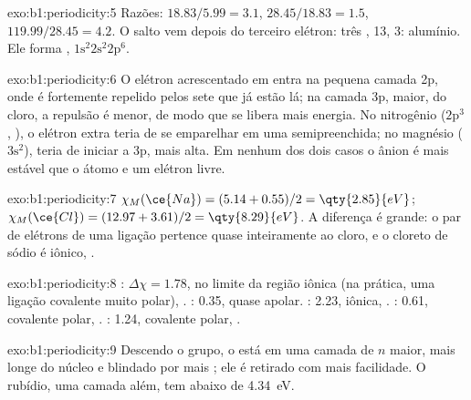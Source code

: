 \begin{solution}{exo:b1:periodicity:5}
Razões: $18.83/5.99 = 3.1$, $28.45/18.83 = 1.5$, $119.99/28.45 = 4.2$. O
salto vem depois do terceiro elétron: três , 
13,  3: alumínio. Ele forma , $1\text{s}^2 2\text{s}^2
2\text{p}^6$.
\end{solution}

\begin{solution}{exo:b1:periodicity:6}
O elétron acrescentado em  entra na pequena camada 2p, onde é
fortemente repelido pelos sete  que já estão lá; na
camada 3p, maior, do cloro, a repulsão é menor, de modo que se libera mais
energia. No nitrogênio ($2\text{p}^3$, ), o elétron extra
teria de se emparelhar em uma  semipreenchida; no magnésio
($3\text{s}^2$), teria de iniciar a  3p, mais alta. Em nenhum dos
dois casos o ânion é mais estável que o átomo e um elétron livre.
\end{solution}

\begin{solution}{exo:b1:periodicity:7}
$\chi_M(\ce{Na}) = (5.14 + 0.55)/2 = \qty{2.85}{eV}$; $\chi_M(\ce{Cl}) =
(12.97 + 3.61)/2 = \qty{8.29}{eV}$. A diferença é grande: o par de
elétrons de uma ligação  pertence quase inteiramente ao cloro,
e o cloreto de sódio é iônico, .
\end{solution}

\begin{solution}{exo:b1:periodicity:8}
: $\Delta\chi = 1.78$, no limite da região iônica (na prática,
uma ligação covalente muito polar), . : 0.35,
quase apolar. : 2.23, iônica, . : 0.61,
covalente polar, . : 1.24, covalente
polar, .
\end{solution}

\begin{solution}{exo:b1:periodicity:9}
Descendo o grupo, o  está em uma camada de $n$ maior,
mais longe do núcleo e blindado por mais ; ele é
retirado com mais facilidade. O rubídio, uma camada além, tem  abaixo de
\qty{4.34}{eV}.
\end{solution}

